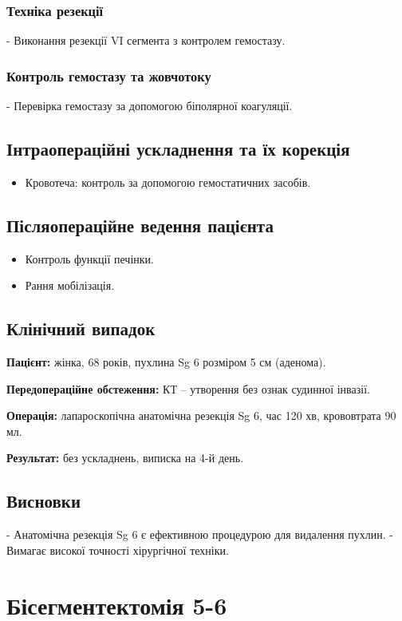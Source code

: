 \begin{refsection}
\subsubsection{Техніка резекції}
- Виконання резекції VI сегмента з контролем гемостазу.

\subsubsection{Контроль гемостазу та жовчотоку}
- Перевірка гемостазу за допомогою біполярної коагуляції.

\subsection{Інтраопераційні ускладнення та їх корекція}
\begin{itemize}
    \item Кровотеча: контроль за допомогою гемостатичних засобів.
\end{itemize}

\subsection{Післяопераційне ведення пацієнта}
\begin{itemize}
    \item Контроль функції печінки.
    \item Рання мобілізація.
\end{itemize}

\subsection{Клінічний випадок}
\textbf{Пацієнт:} жінка, 68 років, пухлина Sg 6 розміром 5 см (аденома).

\textbf{Передопераційне обстеження:} КТ – утворення без ознак судинної інвазії.

\textbf{Операція:} лапароскопічна анатомічна резекція Sg 6, час 120 хв, крововтрата 90 мл.

\textbf{Результат:} без ускладнень, виписка на 4-й день.

\subsection{Висновки}
- Анатомічна резекція Sg 6 є ефективною процедурою для видалення пухлин.
- Вимагає високої точності хірургічної техніки.

\section{Бісегментектомія 5-6}

\end{refsection}
